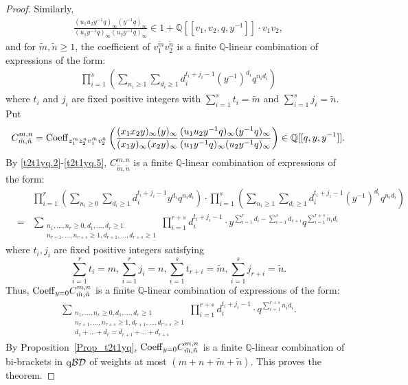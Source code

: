 \documentclass[12pt, reqno]{amsart}
\theoremstyle{definition}
\theoremstyle{remark}
\numberwithin{equation}{section}
\newcommand{\Coe}{ {\rm Coeff} }
\newcommand{\Q}{ \mathbb Q }
\newcommand{\qBD}{{\rm q}{\mathcal {BD}}}
\newcommand{\w}{\tilde}
\numberwithin{equation}{section}
\begin{document}
\begin{proof}
Similarly, 
\begin{eqnarray}  \label{t2t1yq.4}
\frac{(u_1u_2y^{-1}q)_\infty (y^{-1}q)_\infty}
     {(u_1y^{-1}q)_\infty (u_2y^{-1}q)_\infty}
\in 1 + \Q[[v_1, v_2, q, y^{-1}]] \cdot v_1v_2,
\end{eqnarray}
and for $\w m, \w n \ge 1$, the coefficient of $v_1^{\w m} v_2^{\w n}$ is 
a finite $\Q$-linear combination of expressions of the form:
\begin{eqnarray}  \label{t2t1yq.5}
\prod_{i=1}^s \left (\sum_{n_i \ge 1} \sum_{d_i \ge 1} 
d_i^{t_i+j_i-1} (y^{-1})^{d_i}q^{n_i d_i} \right )
\end{eqnarray}
where $t_i$ and $j_i$ are fixed positive integers with
$\sum_{i=1}^s t_i = \w m$ and $\sum_{i=1}^s j_i = \w n$. Put 
$$
  C^{m,n}_{\w m, \w n} 
= \Coe_{z_1^m z_2^n v_1^{\w m} v_2^{\w n}}
  \left (\frac{(x_1x_2y)_\infty (y)_\infty}
     {(x_1y)_\infty (x_2y)_\infty} 
  \frac{(u_1u_2y^{-1}q)_\infty (y^{-1}q)_\infty}
     {(u_1y^{-1}q)_\infty (u_2y^{-1}q)_\infty} \right )
\in \Q[[q, y, y^{-1}]].
$$
By \eqref{t2t1yq.2}-\eqref{t2t1yq.5}, $C^{m,n}_{\w m, \w n}$ is 
a finite $\Q$-linear combination of expressions of the form:
\begin{eqnarray}  \label{t2t1yq.50}
& &\prod_{i=1}^r \left (\sum_{n_i \ge 0} \sum_{d_i \ge 1} 
    d_i^{t_i+j_i-1} y^{d_i}q^{n_i d_i} \right )
  \cdot \prod_{i=1}^{s} \left (\sum_{n_i \ge 1} \sum_{d_i \ge 1} 
    d_i^{t_i+j_i-1} (y^{-1})^{d_i}q^{n_i d_i} \right ) 
    \nonumber   \\
&=&\sum_{\substack{n_1, \ldots, n_r \ge 0, d_1, \ldots, d_r \ge 1\\
    n_{r+1}, \ldots, n_{r+s} \ge 1, d_{r+1}, \ldots, d_{r+s} \ge 1}}
  \prod_{i=1}^{r+s} d_i^{t_i+j_i-1} 
  \cdot y^{\sum_{i=1}^r d_i - \sum_{i=1}^{s} d_{r+i}}
  q^{\sum_{i=1}^{r+s} n_i d_i}
\end{eqnarray}
where $t_i, j_i$ are fixed positive integers satisfying 
$$
\sum_{i=1}^r t_i = m, \sum_{i=1}^r j_i = n,
\sum_{i=1}^{s} t_{r+i} = \w m, \sum_{i=1}^{s} j_{r+i} = \w n. 
$$
Thus, $\Coe_{y=0} C^{m,n}_{\w m, \w n}$ is 
a finite $\Q$-linear combination of expressions of the form:
\begin{eqnarray}  \label{t2t1yq.6}
\sum_{\substack{n_1, \ldots, n_r \ge 0, d_1, \ldots, d_r \ge 1\\
    n_{r+1}, \ldots, n_{r+s} \ge 1, d_{r+1}, \ldots, d_{r+s} \ge 1\\
    d_1 + \ldots + d_r = d_{r+1} + \ldots + d_{r+s}}}
  \prod_{i=1}^{r+s} d_i^{t_i+j_i-1} 
  \cdot q^{\sum_{i=1}^{r+s} n_i d_i}.
\end{eqnarray}
By Proposition~\ref{Prop_t2t1yq}, $\Coe_{y=0} C^{m,n}_{\w m, \w n}$ 
is a finite $\Q$-linear combination of 
bi-brackets in $\qBD$ of weights at most $(m + n + \w m + \w n)$. 
This proves the theorem.
\end{proof}
\end{document}
